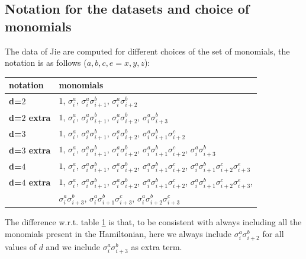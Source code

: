 \documentclass[10pt,a4paper,twoside,twocolumn]{revtex4-1}
\begin{document}
\subsection{Notation for the datasets and choice of monomials}
The data of Jie are computed for different choices of the set of monomials, the notation is as follows ($a,b,c,e=x,y,z$):
\begin{table}[H]
\label{tab:notation-B1}
\begin{tabular}{ |l|l| }
\hline
\textbf{notation} & \textbf{monomials}\\
\hline
\textbf{d=$2$} & $1$, $\sigma^{a}_i$, $\sigma^{a}_i\sigma^{b}_{i+1}$, $\sigma^{a}_i\sigma^{b}_{i+2}$\\
\hline
\textbf{d=$2$ extra} & $1$, $\sigma^{a}_i$, $\sigma^{a}_i\sigma^{b}_{i+1}$, $\sigma^{a}_i\sigma^{b}_{i+2}$, $\sigma^{a}_i\sigma^{b}_{i+3}$\\
\hline
\textbf{d=$3$} & $1$, $\sigma^{a}_i$, $\sigma^{a}_i \sigma^{b}_{i+1}$, $\sigma^{a}_i\sigma^{b}_{i+2}$, $\sigma^{a}_i \sigma^{b}_{i+1} \sigma^{c}_{i+2}$ \\
\hline
\textbf{d=$3$ extra} & $1$, $\sigma^{a}_i$, $\sigma^{a}_i \sigma^{b}_{i+1}$, $\sigma^{a}_i\sigma^{b}_{i+2}$, $\sigma^{a}_i \sigma^{b}_{i+1} \sigma^{c}_{i+2}$, $\sigma^{a}_i\sigma^{b}_{i+3}$ \\
\hline
\textbf{d=$4$} & $1$, $\sigma^{a}_i$, $\sigma^{a}_i \sigma^{b}_{i+1}$, $\sigma^{a}_i\sigma^{b}_{i+2}$, $\sigma^{a}_i \sigma^{b}_{i+1} \sigma^{c}_{i+2}$, $\sigma^{a}_i \sigma^{b}_{i+1} \sigma^{c}_{i+2} \sigma^{e}_{i+3}$\\
\hline
 \textbf{d=$4$ extra} & $1$, $\sigma^{a}_i$, $\sigma^{a}_i \sigma^{b}_{i+1}$, $\sigma^{a}_i\sigma^{b}_{i+2}$, $\sigma^{a}_i \sigma^{b}_{i+1} \sigma^{c}_{i+2}$, $\sigma^{a}_i \sigma^{b}_{i+1} \sigma^{c}_{i+2} \sigma^{e}_{i+3}$, \\
 &  $\sigma^{a}_i \sigma^{b}_{i+3}$, $\sigma^{a}_i \sigma^{b}_{i+1} \sigma^{c}_{i+3}$, $\sigma^{a}_i \sigma^{b}_{i+2} \sigma^{c}_{i+3}$\\
\hline
\end{tabular}
\end{table}

The difference w.r.t. table \ref{tab:notation-B1} is that, to be consistent with always including all the monomials present in the Hamiltonian, here we always include $\sigma^{a}_i\sigma^{b}_{i+2}$ for all values of $d$ and we include $\sigma^{a}_i\sigma^{b}_{i+3}$ as extra term.

 
\end{document}
